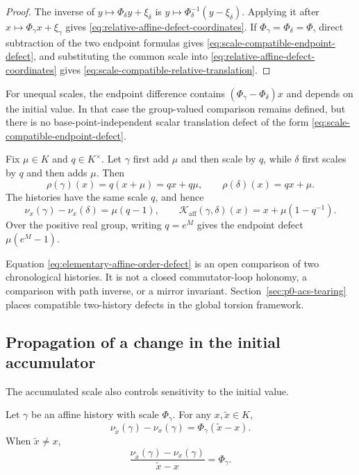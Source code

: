 \begin{proof}
The inverse of $y\mapsto\Phi_\delta y+\xi_\delta$ is
$y\mapsto\Phi_\delta^{-1}(y-\xi_\delta)$.  Applying it after
$x\mapsto\Phi_\gamma x+\xi_\gamma$ gives
\eqref{eq:relative-affine-defect-coordinates}.  If
$\Phi_\gamma=\Phi_\delta=\Phi$, direct subtraction of the two endpoint formulas
gives \eqref{eq:scale-compatible-endpoint-defect}, and substituting the common
scale into \eqref{eq:relative-affine-defect-coordinates} gives
\eqref{eq:scale-compatible-relative-translation}.
\end{proof}

For unequal scales, the endpoint difference contains
$(\Phi_\gamma-\Phi_\delta)x$ and depends on the initial value.  In that case the
group-valued comparison remains defined, but there is no base-point-independent
scalar translation defect of the form
\eqref{eq:scale-compatible-endpoint-defect}.

\begin{example}
\label{ex:elementary-affine-order-defect}
Fix $\mu\in K$ and $q\in K^\times$.  Let $\gamma$ first add $\mu$ and then
scale by $q$, while $\delta$ first scales by $q$ and then adds $\mu$.  Then
\[
  \rho(\gamma)(x)=q(x+\mu)=qx+q\mu,
  \qquad
  \rho(\delta)(x)=qx+\mu.
\]
The histories have the same scale $q$, and hence
\begin{equation}
  \nu_x(\gamma)-\nu_x(\delta)=\mu(q-1),
  \qquad
  \mathcal K_{\mathrm{aff}}(\gamma,\delta)(x)
  =x+\mu(1-q^{-1}).
  \label{eq:elementary-affine-order-defect}
\end{equation}
Over the positive real group, writing $q=e^M$ gives the endpoint defect
$\mu(e^M-1)$.
\end{example}

Equation \eqref{eq:elementary-affine-order-defect} is an open comparison of two
chronological histories.  It is not a closed commutator-loop holonomy, a
comparison with path inverse, or a mirror invariant.
Section~\ref{sec:p0-acs-tearing} places compatible two-history defects in the
global torsion framework.

\subsection{Propagation of a change in the initial accumulator}

The accumulated scale also controls sensitivity to the initial value.

\begin{proposition}
\label{prop:affine-perturbation-propagation}
Let $\gamma$ be an affine history with scale $\Phi_\gamma$.  For any
$x,\widetilde x\in K$,
\begin{equation}
  \nu_{\widetilde x}(\gamma)-\nu_x(\gamma)
  =\Phi_\gamma(\widetilde x-x).
  \label{eq:exact-affine-perturbation}
\end{equation}
When $\widetilde x\ne x$,
\begin{equation}
  \frac{\nu_{\widetilde x}(\gamma)-\nu_x(\gamma)}
       {\widetilde x-x}
  =\Phi_\gamma.
  \label{eq:affine-perturbation-ratio}
\end{equation}
\end{proposition}

